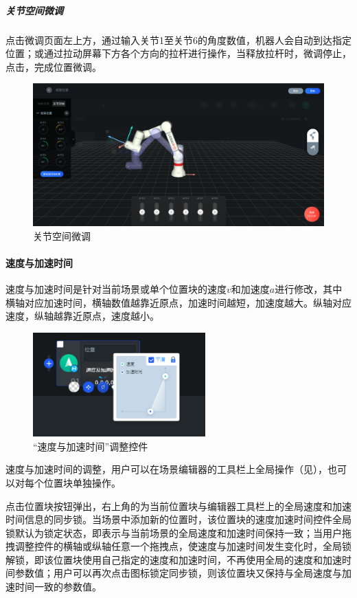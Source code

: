 \subparagraph{关节空间微调}
点击微调页面左上方，通过输入关节1至关节6的角度数值，机器人会自动到达指定位置；或通过拉动屏幕下方各个方向的拉杆进行操作，当释放拉杆时，微调停止，点击，完成位置微调。

\begin{figure}[ht]
	\centering
	\includegraphics[width=\textwidth]{screen/3-10.png}
	\caption{关节空间微调}
	\label{fig:关节空间微调}
\end{figure}

\paragraph{速度与加速时间}
速度与加速时间是针对当前场景或单个位置块的速度$v$和加速度$a$进行修改，其中横轴对应加速时间，横轴数值越靠近原点，加速时间越短，加速度越大。纵轴对应速度，纵轴越靠近原点，速度越小。

\begin{figure}[ht]
	\centering
	\includegraphics[height=4cm]{screen/3-11.png}
	\caption{“速度与加速时间”调整控件}
	\label{fig:速度与加速时间}
\end{figure}

速度与加速时间的调整，用户可以在场景编辑器的工具栏上全局操作（见），也可以对每个位置块单独操作。

点击位置块按钮弹出，右上角的为当前位置块与编辑器工具栏上的全局速度和加速时间信息的同步锁。当场景中添加新的位置时，该位置块的速度加速时间控件全局锁默认为锁定状态，即表示与当前场景的全局速度和加速时间保持一致；当用户拖拽调整控件的横轴或纵轴任意一个拖拽点，使速度与加速时间发生变化时，全局锁解锁，即该位置块使用自己指定的速度和加速时间，不再使用全局的速度和加速时间参数值；用户可以再次点击图标锁定同步锁，则该位置块又保持与全局速度与加速时间一致的参数值。

